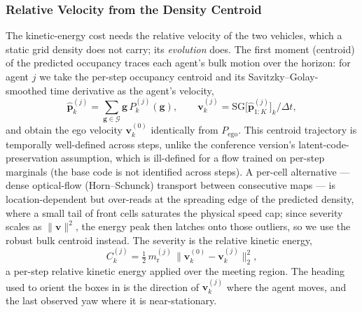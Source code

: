 \documentclass[journal]{IEEEtran}
\begin{document}
\subsubsection{Relative Velocity from the Density Centroid}\label{sec:latent_velocity_field}
The kinetic-energy cost needs the relative velocity of the two vehicles, which a static grid density does not carry; its \emph{evolution} does. The first moment (centroid) of the predicted occupancy traces each agent's bulk motion over the horizon: for agent $j$ we take the per-step occupancy centroid and its Savitzky--Golay-smoothed time derivative as the agent's velocity,
\begin{equation}
\hat{\mathbf{p}}^{(j)}_{k}=\!\!\sum_{\mathbf{g}\in\mathcal{G}}\!\mathbf{g}\,P^{(j)}_{k}(\mathbf{g}),\qquad
\mathbf{v}^{(j)}_{k}=\mathrm{SG}\big[\hat{\mathbf{p}}^{(j)}_{1:K}\big]_k\big/\Delta t,
\label{eq:centroid_topm}
\end{equation}
and obtain the ego velocity $\mathbf{v}^{(0)}_k$ identically from $P_{\mathrm{ego}}$. This centroid trajectory is temporally well-defined across steps, unlike the conference version's latent-code-preservation assumption, which is ill-defined for a flow trained on per-step marginals (the base code is not identified across steps). A per-cell alternative --- dense optical-flow (Horn--Schunck) transport between consecutive maps --- is location-dependent but over-reads at the spreading edge of the predicted density, where a small tail of front cells saturates the physical speed cap; since severity scales as $\lVert\mathbf{v}\rVert^2$, the energy peak then latches onto those outliers, so we use the robust bulk centroid instead. The severity is the relative kinetic energy,
\begin{equation}
C^{(j)}_{k}=\tfrac{1}{2}\,m^{(j)}_{\mathrm{r}}\,\big\|\mathbf{v}^{(0)}_{k}-\mathbf{v}^{(j)}_{k}\big\|_2^2,
\label{eq:collision_cost_field}
\end{equation}
a per-step relative kinetic energy applied over the meeting region. The heading used to orient the boxes in  is the direction of $\mathbf{v}^{(j)}_k$ where the agent moves, and the last observed yaw where it is near-stationary.
\end{document}
